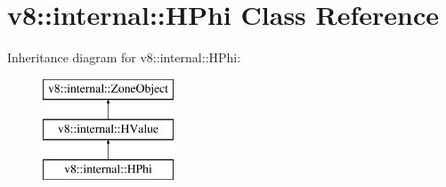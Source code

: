 \hypertarget{classv8_1_1internal_1_1_h_phi}{}\section{v8\+:\+:internal\+:\+:H\+Phi Class Reference}
\label{classv8_1_1internal_1_1_h_phi}
Inheritance diagram for v8\+:\+:internal\+:\+:H\+Phi\+:\begin{figure}[H]
\begin{center}
\leavevmode
\includegraphics[height=3.000000cm]{classv8_1_1internal_1_1_h_phi}
\end{center}
\end{figure}
